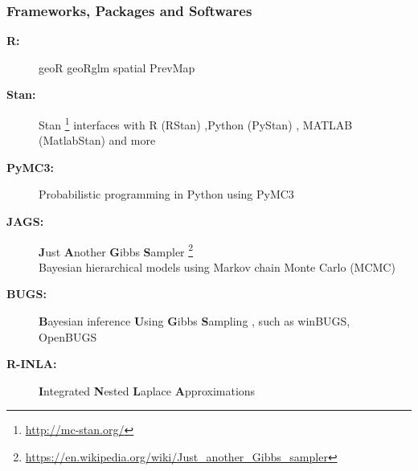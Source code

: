 \documentclass{beamer}
\begin{document}
\begin{frame}[allowframebreaks]
\frametitle{Frameworks, Packages and Softwares}

\begin{description}
\item[\textbf{R:}] geoR geoRglm spatial PrevMap \\
\citet{R-geoR,R-geoRglm,R-spatial,Giorgi2016}

\item[\textbf{Stan:}] Stan \footnote{\scriptsize \url{http://mc-stan.org/} }  
interfaces with R (RStan) ,Python (PyStan) , MATLAB (MatlabStan) 
and  more \\ \citet{Stan2015,Stan2017}

\item[\textbf{PyMC3:}] Probabilistic programming in Python using PyMC3 \\ \citet{Salvatier2016}

\item[\textbf{JAGS:}] \textbf{J}ust \textbf{A}nother \textbf{G}ibbs \textbf{S}ampler \footnote{\scriptsize \url{https://en.wikipedia.org/wiki/Just_another_Gibbs_sampler}} \\
Bayesian hierarchical models using Markov chain Monte Carlo (MCMC)
\item[\textbf{BUGS:}] \textbf{B}ayesian inference \textbf{U}sing \textbf{G}ibbs \textbf{S}ampling ,
such as winBUGS, OpenBUGS 
\item[\textbf{R-INLA:}] \textbf{I}ntegrated \textbf{N}ested \textbf{L}aplace \textbf{A}pproximations \\
\citet{Rue2009,R-INLA,Rue2017arXiv}
\end{description}


\end{frame}



\begin{frame}[allowframebreaks]


\end{frame}
\end{document}
